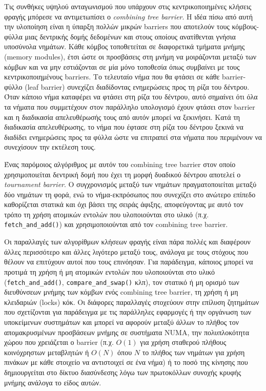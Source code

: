 Τις συνθήκες υψηλού ανταγωνισμού που υπάρχουν στις κεντρικοποιημένες κλήσεις φραγής μπόρεσε να αντιμετωπίσει ο \textit{combining tree barrier}. Η ιδέα πίσω από αυτή την υλοποίηση είναι η ύπαρξη πολλών μικρών barriers που αποτελούν τους κόμβους-φύλλα μιας δεντρικής δομής δεδομένων και στους οποίους ανατίθενται γνήσια υποσύνολα νημάτων. Κάθε κόμβος τοποθετείται σε διαφορετικά τμήματα μνήμης (memory modules), έτσι ώστε οι προσβάσεις στη μνήμη να μοιράζονται μεταξύ των κόμβων και να μην εστιάζονται σε μία μόνο τοποθεσία όπως συμβαίνει με τους κεντρικοποιημένους barriers. Το τελευταίο νήμα που θα φτάσει σε κάθε barrier-φύλλο (leaf barrier) συνεχίζει διαδίδοντας ενημερώσεις προς τη ρίζα του δέντρου. Όταν κάποιο νήμα καταφέρει να φτάσει στη ρίζα του δέντρου, αυτό σημαίνει ότι όλα τα νήματα που συμμετέχουν στον παράλληλο υπολογισμό έχουν φτάσει στον barrier και η διαδικασία απελευθέρωσής τους από αυτόν μπορεί να ξεκινήσει. Κατά τη διαδικασία απελευθέρωσης, το νήμα που έφτασε στη ρίζα του δέντρου ξεκινά να διαδίδει ενημερώσεις προς τα φύλλα ώστε να επιτραπεί στα νήματα που περιμένουν να συνεχίσουν την εκτέλεση τους.

Ένας παρόμοιος αλγόριθμος με αυτόν του combining tree barrier στον οποίο χρησιμοποιείται δεντρική δομή που έχει τη μορφή δυαδικού δέντρου αποτελεί ο \textit{tournament barrier}. Ο συγχρονισμός μεταξύ των νημάτων πραγματοποιείται μεταξύ δύο νημάτων τη φορά, ενώ το νήμα-εκπρόσωπος που συνεχίζει στο ανώτερο επίπεδο καθορίζεται στατικά και όχι βάσει της σειράς άφιξης, αποφεύγοντας με αυτό τον τρόπο τη χρήση ατομικών εντολών που υλοποιούνται στο υλικό (π.χ. \texttt{fetch\_and\_add()}) και χρησιμοποιούνται από τον combining tree barrier.

Οι παραλλαγές των αλγορίθμων κλήσεων φραγής είναι πάρα πολλές και διαφέρουν άλλες περισσότερο και άλλες λιγότερο μεταξύ τους, ανάλογα με τους στόχους που θέλουν να επιτύχουν αυτοί που τους επινόησαν. Για παράδειγμα, κάποιος μπορεί να προτιμά τη χρήση ή μη ατομικών εντολών που υλοποιούνται στο υλικό (\texttt{fetch\_and\_add()}, \texttt{compare\_and\_swap()} κλπ), τον στατικό ή μη ορισμό των διευθύνσεων μνήμης των κόμβων ενός combining tree barrier, τη χρήση ή μη κλειδαριών (locks) κόκ. Οι διάφορες παραλλαγές στοχεύουν στην επίλυση ζητημάτων που σχετίζονται για παράδειγμα με τις παράλληλες εφαρμογές ή την οργάνωση των υποκείμενων συστημάτων και μπορεί να αφορούν μεταξύ άλλων το πλήθος τον απομακρυσμένων προσβάσεων μνήμης σε συστήματα NUMA, την πολυπλοκότητα χώρου που χρειάζεται ο barrier (π.χ. $O(1)$ για χρήση σταθερού πλήθους κοινόχρηστων μεταβλητών ή $O(N)$ όπου $N$ το πλήθος των νημάτων για χρήση πινάκων με κάθε στοιχείο να αντιστοιχεί σε ένα νήμα) ή το ποσό της κίνησης που δημιουργείται στο δίκτυο διασύνδεσης λόγω των πρωτοκόλλων συνοχής κρυφής μνήμης ανάλογα το είδος αυτών.

